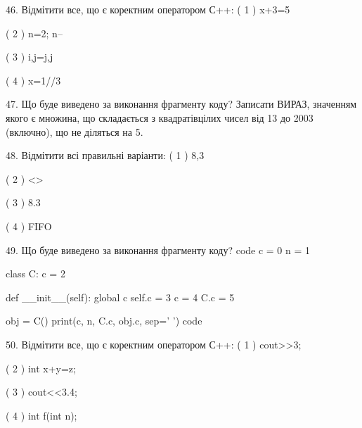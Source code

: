 \documentclass[11pt]{article}
\begin{document}
46. Відмітити все, що є коректним оператором С++:
( 1 ) x+3=5

( 2 ) n=2; n--

( 3 ) i,j=j,j

( 4 ) x=1//3

47. Що буде виведено за виконання фрагменту коду?
Записати ВИРАЗ, значенням якого є множина, що складається з квадратівцілих чисел від 13 до 2003 (включно), що не діляться на 5.

48. Відмітити всі правильні варіанти:
( 1 ) 8,3

( 2 ) <>

( 3 ) 8.3

( 4 ) FIFO

49. Що буде виведено за виконання фрагменту коду?
code
c = 0
n = 1

class C:
    c = 2
    
    def __init__(self):
global c        self.c = 3
        c = 4
        C.c = 5

obj = C()
print(c, n, C.c, obj.c, sep=' ')
code

50. Відмітити все, що є коректним оператором С++:
( 1 ) cout>>3;

( 2 ) int x+y=z;

( 3 ) cout<<3.4;

( 4 ) int f(int n);



















































\newpage
\end{document}
